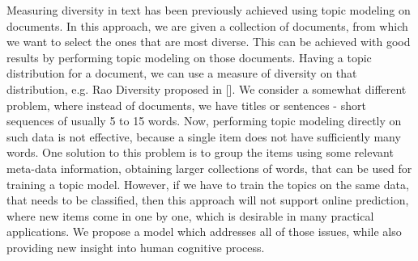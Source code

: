 Measuring diversity in text has been previously achieved using topic
modeling on documents. In this approach, we are given a collection of
documents, from which we want to select the ones that are most
diverse. This can be achieved with good results by performing topic
modeling on those documents. Having a topic distribution for a
document, we can use a measure of diversity on that distribution,
e.g. Rao Diversity proposed in []. We consider a somewhat different
problem, where instead of documents, we have titles or sentences -
short sequences of usually 5 to 15 words. Now, performing topic
modeling directly on such data is not effective, because a single item
does not have sufficiently many words. One solution to this problem is
to group the items using some relevant meta-data information,
obtaining larger collections of words, that can be used for training a
topic model. However, if we have to train the topics on the same data,
that needs to be classified, then this approach will not support
online prediction, where new items come in one by one, which is
desirable in many practical applications. We propose a model which
addresses all of those issues, while also providing new insight into
human cognitive process.
